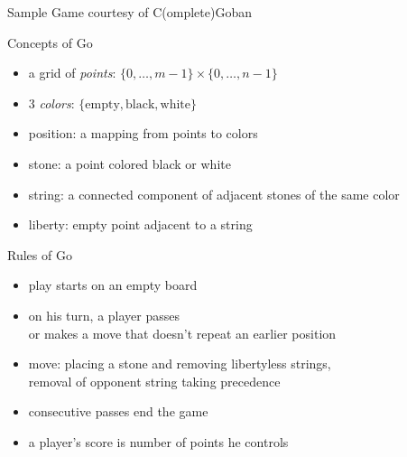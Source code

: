 \documentclass{prosper}
\begin{document}

\begin{slide}{Sample Game}
courtesy of C(omplete)Goban
\end{slide}

\begin{slide}{Concepts of Go}
\begin{itemize}
\item a grid of {\em points}: $\{0,\ldots,m-1\}\times \{0,\ldots,n-1\}$
\item 3 {\em colors}: $\{\mbox{empty}, \mbox{black}, \mbox{white}\}$
\item position: a mapping from points to colors
\item stone: a point colored black or white
\item string: a connected component of adjacent stones of the same color
\item liberty: empty point adjacent to a string
\end{itemize}
\end{slide}

\begin{slide}{Rules of Go}
\begin{itemize}
\item play starts on an empty board
\item on his turn, a player passes \\
      or makes a move that doesn't repeat an earlier position
\item move: placing a stone and removing libertyless strings, \\
      removal of opponent string taking precedence
\item consecutive passes end the game \\
\item a player's score is number of points he controls
\end{itemize}
\end{slide}

\end{document}
